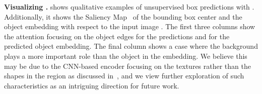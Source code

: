 \noindent\textbf{Visualizing \model.}  shows qualitative examples of \model unsupervised box predictions with . Additionally, it shows the Saliency Map~\cite{simonyan2013deep} of the  bounding box center and the object embedding with respect to the input image . The first three columns show the attention focusing on the object edges for the  predictions and  for the predicted object embedding. The final column shows a case where the background plays a more important role than the object in the embedding. We believe this may be due to the CNN-based encoder focusing on the textures rather than the shapes in the region as discussed in~\cite{geirhos2018imagenet}, and we view further exploration of such characteristics as an intriguing direction for future work.
























